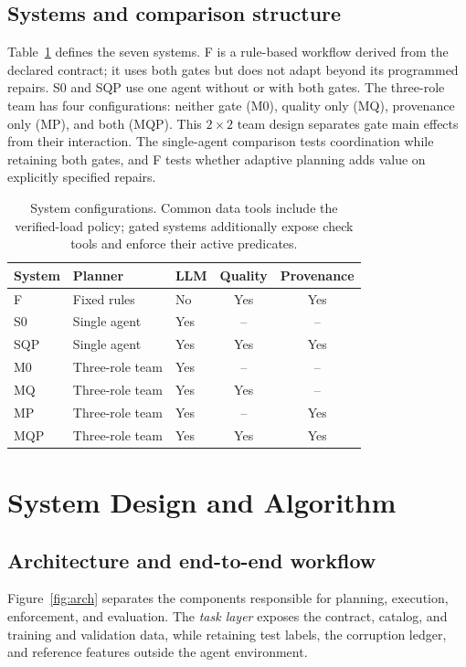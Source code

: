 \documentclass[conference]{IEEEtran}
\newcommand{\sys}[1]{\textsf{#1}}
\begin{document}
\subsection{Systems and comparison structure}
\label{sec:systems}
Table~\ref{tab:systems} defines the seven systems. \sys{F} is a rule-based workflow derived from the declared contract; it uses both gates but does not adapt beyond its programmed repairs. \sys{S0} and \sys{SQP} use one agent without or with both gates. The three-role team has four configurations: neither gate (\sys{M0}), quality only (\sys{MQ}), provenance only (\sys{MP}), and both (\sys{MQP}). This $2\times2$ team design separates gate main effects from their interaction. The single-agent comparison tests coordination while retaining both gates, and \sys{F} tests whether adaptive planning adds value on explicitly specified repairs.

\begin{table}[t]
\caption{System configurations. Common data tools include the verified-load policy; gated systems additionally expose check tools and enforce their active predicates.}
\label{tab:systems}
\centering\footnotesize\setlength{\tabcolsep}{5pt}
\begin{tabular}{@{}lllcc@{}}
\toprule
System & Planner & LLM & Quality & Provenance \\
\midrule
\sys{F} & Fixed rules & No & Yes & Yes \\
\sys{S0} & Single agent & Yes & -- & -- \\
\sys{SQP} & Single agent & Yes & Yes & Yes \\
\sys{M0} & Three-role team & Yes & -- & -- \\
\sys{MQ} & Three-role team & Yes & Yes & -- \\
\sys{MP} & Three-role team & Yes & -- & Yes \\
\sys{MQP} & Three-role team & Yes & Yes & Yes \\
\bottomrule
\end{tabular}
\end{table}

\section{System Design and Algorithm}
\label{sec:architecture}
\subsection{Architecture and end-to-end workflow}
Figure~\ref{fig:arch} separates the components responsible for planning, execution, enforcement, and evaluation. The \emph{task layer} exposes the contract, catalog, and training and validation data, while retaining test labels, the corruption ledger, and reference features outside the agent environment.
\end{document}
